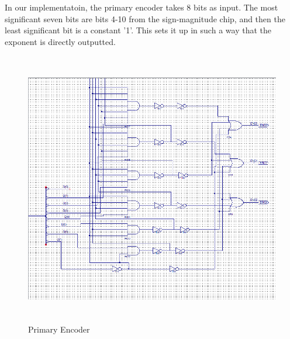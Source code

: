 \documentclass[paper=letter, fontsize=11pt]{scrartcl}
\begin{document}
In our implementatoin, the primary encoder takes 8 bits as input. The most significant seven bits are bits 4-10 from the sign-magnitude chip, and then the least significant bit is a constant '1'. This sets it up in such a way that the exponent is directly outputted. 
\begin{figure}[H]
\includegraphics[height=120mm]{encoder.png}
\centering
\caption{Primary Encoder}
\label{overflow}
\end{figure}
\end{document}
